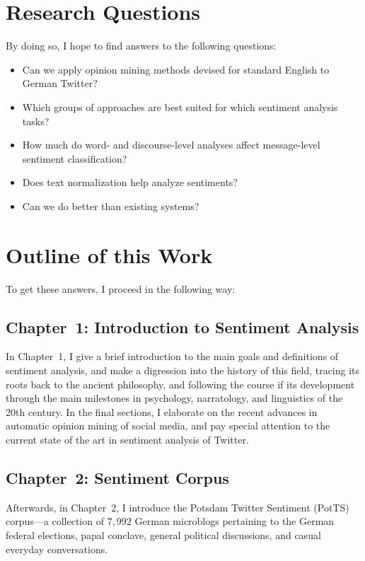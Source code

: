 \documentclass[11pt]{article}
\begin{document}
\section{Research Questions}

By doing so, I hope to find answers to the following questions:
\begin{itemize}
\item Can we apply opinion mining methods devised for standard English
  to German Twitter?
\item Which groups of approaches are best suited for which sentiment
  analysis tasks?
\item How much do word- and discourse-level analyses affect
  message-level sentiment classification?
\item Does text normalization help analyze sentiments?
\item Can we do better than existing systems?
\end{itemize}

\section{Outline of this Work}

To get these answers, I proceed in the following way:

\subsection{Chapter~1: Introduction to Sentiment Analysis}

In Chapter~1, I give a brief introduction to the main goals and
definitions of sentiment analysis, and make a digression into the
history of this field, tracing its roots back to the ancient
philosophy, and following the course if its development through the
main milestones in psychology, narratology, and linguistics of the
20th century.  In the final sections, I elaborate on the recent
advances in automatic opinion mining of social media, and pay special
attention to the current state of the art in sentiment analysis of
Twitter.

\subsection{Chapter~2: Sentiment Corpus}

Afterwards, in Chapter~2, I introduce the Potsdam Twitter Sentiment
(PotTS) corpus---a collection of $7,992$ German microblogs pertaining
to the German federal elections, papal conclave, general political
discussions, and casual everyday conversations.
\end{document}
